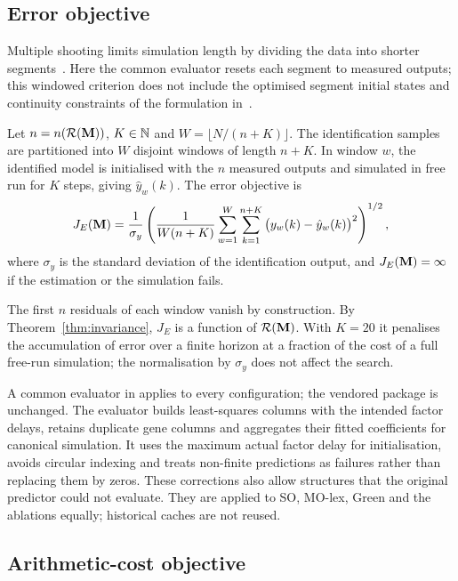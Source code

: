 \subsection{Error objective}
Multiple shooting limits simulation length by dividing the data into shorter segments~\cite{Ribeiro2020}. Here the common evaluator resets each segment to measured outputs; this windowed criterion does not include the optimised segment initial states and continuity constraints of the formulation in~\cite{Ribeiro2020}.

\begin{definition}\label{def:je}
Let $n=n(\mathcal{R}(\mathbf{M}))$, $K\in\mathbb{N}$ and $W=\lfloor N/(n+K)\rfloor$. The identification samples are partitioned into $W$
disjoint windows of length $n+K$. In window $w$, the identified model is initialised with the $n$ measured outputs
and simulated in free run for $K$ steps, giving $\hat y_w(k)$. The error objective is
\begin{equation}
J_E(\mathbf{M})=\frac{1}{\sigma_y}\left(\frac{1}{W(n+K)}\sum_{w=1}^{W}\sum_{k=1}^{n+K}\big(y_w(k)-\hat y_w(k)\big)^2\right)^{1/2},
\label{eq:je}
\end{equation}
where $\sigma_y$ is the standard deviation of the identification output, and $J_E(\mathbf{M})=\infty$ if the estimation or
the simulation fails.
\end{definition}

The first $n$ residuals of each window vanish by construction. By Theorem~\ref{thm:invariance}, $J_E$ is a function
of $\mathcal{R}(\mathbf{M})$. With $K=20$ it penalises the accumulation of error over a finite horizon at a fraction of the cost of a
full free-run simulation; the normalisation by $\sigma_y$ does not affect the search.

A common evaluator in  applies to every configuration; the vendored package is unchanged. The evaluator builds least-squares columns with the intended factor delays, retains duplicate gene columns and aggregates their fitted coefficients for canonical simulation. It uses the maximum actual factor delay for initialisation, avoids circular indexing and treats non-finite predictions as failures rather than replacing them by zeros. These corrections also allow structures that the original predictor could not evaluate. They are applied to SO, MO-lex, Green and the ablations equally; historical caches are not reused.

\subsection{Arithmetic-cost objective}

